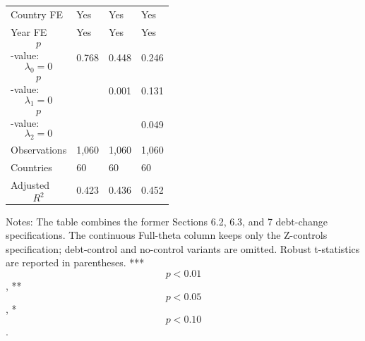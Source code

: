 \begin{table}[H]
\begin{threeparttable}
\begin{tabularx}{\textwidth}{lYYY}
Country FE & Yes & Yes & Yes \\
Year FE & Yes & Yes & Yes \\
$$p$$-value: $$\lambda_0=0$$ & 0.768 & 0.448 & 0.246 \\
$$p$$-value: $$\lambda_1=0$$ &  & 0.001 & 0.131 \\
$$p$$-value: $$\lambda_2=0$$ &  &  & 0.049 \\
Observations & 1,060 & 1,060 & 1,060 \\
Countries & 60 & 60 & 60 \\
Adjusted $$R^2$$ & 0.423 & 0.436 & 0.452 \\
\bottomrule
\end{tabularx}
\begin{tablenotes}[flushleft]\footnotesize
\item Notes: The table combines the former Sections 6.2, 6.3, and 7 debt-change specifications. The continuous Full-theta column keeps only the Z-controls specification; debt-control and no-control variants are omitted. Robust t-statistics are reported in parentheses. *** $$p<0.01$$, ** $$p<0.05$$, * $$p<0.10$$.
\end{tablenotes}
\end{threeparttable}
\end{table}
